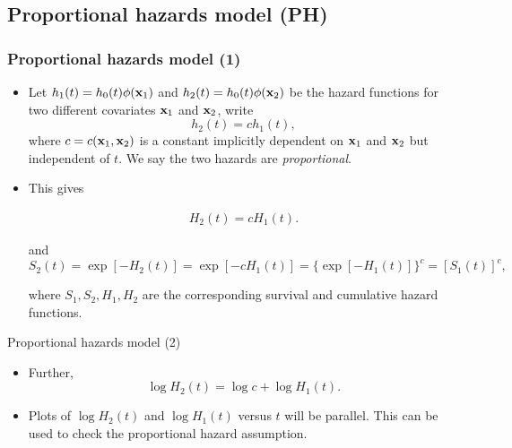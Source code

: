 \documentclass{beamer}
\newenvironment{wideitemize}%
  {\begin{itemize}%
    \setlength{\parskip}{1em}}%
  {\end{itemize}}
\newcommand{\currentsubsection}{}
\let\oldsubsection\subsection
\renewcommand{\subsection}[1]{\oldsubsection{#1}\renewcommand{\currentsubsection}{#1}}
\begin{document}


\subsection{Proportional hazards model (PH)}


\begin{frame}\frametitle{Proportional hazards model (1)}
\begin{itemize}

\item Let $h_1(t) = h_0(t) \phi({\bf x}_1)$ and $h_2(t) = h_0(t) \phi({\bf x}_2)$ be the hazard functions for two different covariates ${\bf x}_1$ and ${\bf x}_2$, write 
\[ h_2(t) = c h_1(t),
\]
where $c = c({\bf x}_1, {\bf x}_2)$ is a constant implicitly dependent on ${\bf x}_1$ and ${\bf x}_2$ but independent of $t$. We say the two hazards are \emph{proportional}. 

\item This gives 

\begin{eqnarray*} H_2(t) =c H_1(t). \label{propch} \end{eqnarray*}

and 
\[ S_2(t) = \exp[-H_2(t) ] = \exp[-cH_1(t) ] = \{\exp
[-H_1(t)]\}^c = [S_1(t)]^c, \]

where $S_1, S_2, H_1, H_2$ are the corresponding survival and cumulative hazard functions.  




\end{itemize}
\end{frame}


\begin{frame} {Proportional hazards model (2)}
\begin{wideitemize}

\item Further, 
\[ \log H_2(t) = \log c  + \log H_1(t).\]


\item

Plots of $\log H_2(t)$ and $\log H_1(t)$ versus $t$ will
be parallel.  This can be used to check the proportional hazard
assumption.
\end{wideitemize}
\end{frame}
\end{document}

